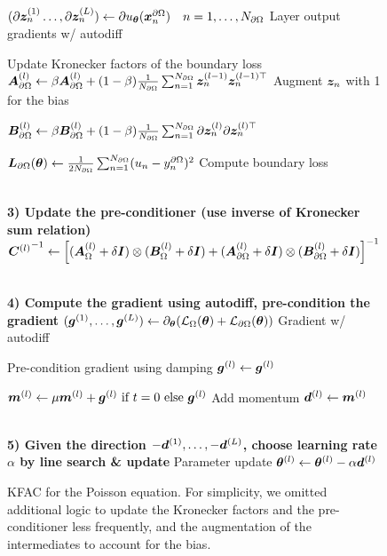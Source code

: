 \begin{figure}
\begin{algorithmic}
  \State $(\partial{\bm{z}}_n^{(1)}\dots, \partial{\bm{z}}_n^{(L)}) \gets \partial u_{{\bm{\theta}}}({\bm{x}}_n^{\partial\Omega})\quad n=1, \dots, N_{\partial\Omega}$ \Comment Layer output gradients w/ autodiff

   \Comment Update Kronecker factors of the boundary loss
  \State ${\bm{A}}_{\partial\Omega}^{(l)} \gets \beta {\bm{A}}_{\partial\Omega}^{(l)} + (1-\beta) \frac1{N_{\partial\Omega}} \sum_{n=1}^{N_{\partial\Omega}} {\bm{z}}_n^{(l-1)} {\bm{z}}_n^{(l-1)\top}$ \Comment Augment ${\bm{z}}_n$ with 1 for the bias

  \State ${\bm{B}}_{\partial\Omega}^{(l)} \gets \beta {\bm{B}}_{\partial\Omega}^{(l)} + (1-\beta) \frac1{N_{\partial\Omega}} \sum_{n=1}^{N_{\partial\Omega}} \partial{\bm{z}}_n^{(l)} \partial{\bm{z}}_n^{(l)\top}$
  \EndFor

  \State ${\bm{L}}_{\partial\Omega}({\bm{\theta}}) \gets \frac{1}{2 N_{\partial\Omega}}\sum_{n=1}^{N_{\partial\Omega}} (u_n - y^{\partial \Omega}_n)^2$ \Comment Compute boundary loss

  \\
  \State \textbf{3) Update the pre-conditioner (use inverse of Kronecker sum relation)}
  \State $ {{\bm{C}}^{(l)}}^{-1} \gets \left[({\bm{A}}_{\Omega}^{(l)} + \delta {\bm{I}}) \otimes ({\bm{B}}_{\Omega}^{(l)} + \delta {\bm{I}}) + ({\bm{A}}_{\partial\Omega}^{(l)} + \delta {\bm{I}}) \otimes ({\bm{B}}_{\partial\Omega}^{(l)} + \delta {\bm{I}})  \right]^{-1}$

  \\
  \State \textbf{4) Compute the gradient using autodiff, pre-condition the gradient}
  \State $({\bm{g}}^{(1)}, \dots, {\bm{g}}^{(L)}) \gets \partial_{{\bm{\theta}}} ( {\mathcal{L}}_{\Omega}({\bm{\theta}}) + {\mathcal{L}}_{\partial\Omega}({\bm{\theta}}))$ \Comment Gradient w/ autodiff

  \Comment Pre-condition gradient using damping
  \State ${\bm{g}}^{(l)} \gets  {\bm{g}}^{(l)}$

  \State ${\bm{m}}^{(l)} \gets \mu {\bm{m}}^{(l)} + {\bm{g}}^{(l)} \text{ if $t=0$ else } {\bm{g}}^{(l)}$ \Comment Add momentum
  \State ${\bm{d}}^{(l)} \gets {\bm{m}}^{(l)}$
  \EndFor

  \\
  \State \textbf{5) Given the direction $-{\bm{d}}^{(1)}, \dots, -{\bm{d}}^{(L)}$, choose learning rate $\alpha$ by line search \& update}
   \Comment Parameter update
  \State ${\bm{\theta}}^{(l)} \gets {\bm{\theta}}^{(l)} - \alpha {\bm{d}}^{(l)}$
  \EndFor
  \EndFor
\end{algorithmic}
\caption{KFAC for the Poisson equation.
  For simplicity, we omitted additional logic to update the Kronecker factors and the pre-conditioner less frequently, and the augmentation of the intermediates to account for the bias.}
\end{figure}
